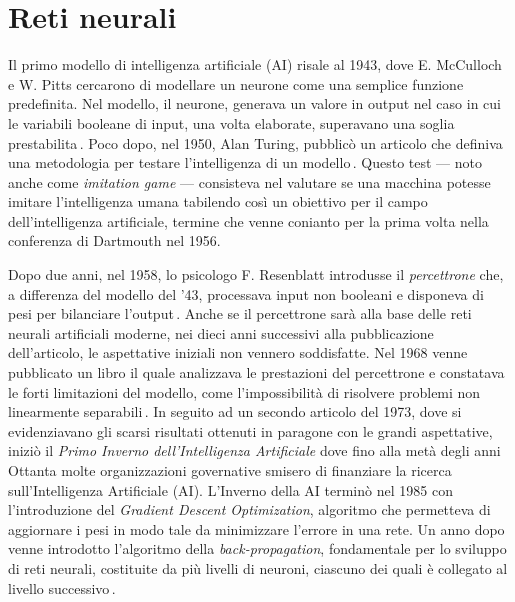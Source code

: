 
\chapter{Reti neurali}\label{chp:neural-networks}
% 
Il primo modello di intelligenza artificiale (\acs{AI}) risale al 1943, dove E. McCulloch e W. Pitts cercarono di modellare un neurone come una semplice funzione predefinita. Nel modello, il neurone, generava un valore in output nel caso in cui le variabili booleane di input, una volta elaborate, superavano una soglia prestabilita\,\cite[``A logical calculus of the ideas immanent in nervous activity'']{mcculloch1943logical}. Poco dopo, nel 1950, Alan Turing, pubblicò un articolo che definiva una metodologia per testare l'intelligenza di un modello\,\cite[``Computing machinery and intelligence'']{turing2009computing}. Questo test — noto anche come \textit{imitation game} — consisteva nel valutare se una macchina potesse imitare l'intelligenza umana tabilendo così un obiettivo per il campo dell'intelligenza artificiale, termine che venne conianto per la prima volta nella conferenza di Dartmouth nel 1956.

Dopo due anni, nel 1958, lo psicologo F. Resenblatt introdusse il \textsl{percettrone} che, a differenza del modello del '43, processava input non booleani e disponeva di pesi per bilanciare l'output\,\cite[``The perceptron: a probabilistic model for information storage and organization in the brain.'']{rosenblatt1958perceptron}. Anche se il percettrone sarà alla base delle reti neurali artificiali moderne, nei dieci anni successivi alla pubblicazione dell'articolo, le aspettative iniziali non vennero soddisfatte. Nel 1968 venne pubblicato un libro il quale analizzava le prestazioni del percettrone e constatava le forti limitazioni del modello, come l'impossibilità di risolvere problemi non linearmente separabili\,\cite[``Perceptrons'']{minsky2017perceptrons}. In seguito ad un secondo articolo del 1973, dove si evidenziavano gli scarsi risultati ottenuti in paragone con le grandi aspettative, iniziò il \textsl{Primo Inverno dell'Intelligenza Artificiale} dove fino alla metà degli anni Ottanta molte organizzazioni governative smisero di finanziare la ricerca sull'Intelligenza Artificiale (\acs{AI}). L'Inverno della \acs{AI} terminò nel 1985 con l'introduzione del \textit{Gradient Descent Optimization}, algoritmo che permetteva di aggiornare i pesi in modo tale da minimizzare l'errore in una rete. Un anno dopo venne introdotto l'algoritmo della \textit{back-propagation}, fondamentale per lo sviluppo di reti neurali, costituite da più livelli di neuroni, ciascuno dei quali è collegato al livello successivo\,\cite[``Learning representations by back-propagating errors'']{rumelhart1986learning}.

